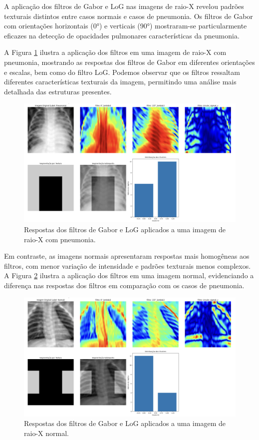 \documentclass[sigconf,nonacm]{acmart}
\begin{document}
A aplicação dos filtros de Gabor e LoG nas imagens de raio-X revelou padrões texturais distintos entre casos normais e casos de pneumonia. Os filtros de Gabor com orientações horizontais (0°) e verticais (90°) mostraram-se particularmente eficazes na detecção de opacidades pulmonares características da pneumonia.

A Figura \ref{fig:filtros_pneumonia} ilustra a aplicação dos filtros em uma imagem de raio-X com pneumonia, mostrando as respostas dos filtros de Gabor em diferentes orientações e escalas, bem como do filtro LoG. Podemos observar que os filtros ressaltam diferentes características texturais da imagem, permitindo uma análise mais detalhada das estruturas presentes.
\begin{figure}[h]
  \centering
  \includegraphics[width=1\linewidth]{../images/filtros_pneumonia.png}
  \caption{Respostas dos filtros de Gabor e LoG aplicados a uma imagem de raio-X com pneumonia.}
  \label{fig:filtros_pneumonia}
\end{figure}

Em contraste, as imagens normais apresentaram respostas mais homogêneas aos filtros, com menor variação de intensidade e padrões texturais menos complexos. A Figura \ref{fig:filtros_normal} ilustra a aplicação dos filtros em uma imagem normal, evidenciando a diferença nas respostas dos filtros em comparação com os casos de pneumonia.

\begin{figure}[h]
  \centering
  \includegraphics[width=1\linewidth]{../images/filtros_normal.png}
  \caption{Respostas dos filtros de Gabor e LoG aplicados a uma imagem de raio-X normal.}
  \label{fig:filtros_normal}
\end{figure}
\end{document}
